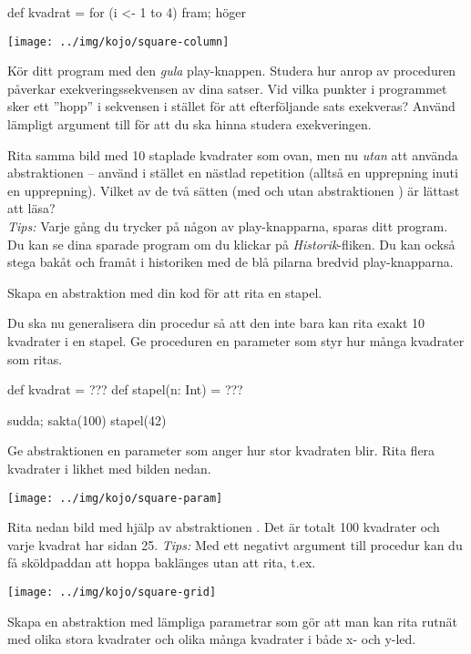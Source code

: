 \begin{Code}
def kvadrat = for (i <- 1 to 4) {fram; höger}
\end{Code}

\texttt{[image: ../img/kojo/square-column]}

\Subtask Kör ditt program med den \emph{gula} play-knappen. Studera hur anrop av proceduren  påverkar exekveringssekvensen av dina satser. Vid vilka punkter i programmet sker ett ''hopp'' i sekvensen i stället för att efterföljande sats exekveras? Använd lämpligt argument till  för att du ska hinna studera exekveringen.

\Subtask Rita samma bild med 10 staplade kvadrater som ovan, men nu \emph{utan} att använda abstraktionen  -- använd i stället en nästlad repetition (alltså en upprepning inuti en upprepning). Vilket av de två sätten (med och utan abstraktionen ) är lättast att läsa?\\ \emph{Tips:} Varje gång du trycker på någon av play-knapparna, sparas ditt program. Du kan se dina sparade program om du klickar på \emph{Historik}-fliken. Du kan också stega bakåt och framåt i historiken med de blå pilarna bredvid play-knapparna.

\Subtask Skapa en abstraktion  med din kod för att rita en stapel.

\Subtask Du ska nu generalisera din procedur så att den inte bara kan rita exakt 10 kvadrater i en stapel. Ge proceduren  en parameter  som styr hur många kvadrater som ritas.
\begin{Code}
def kvadrat = ???
def stapel(n: Int) = ???

sudda; sakta(100)
stapel(42)
\end{Code}

\Subtask Ge abstraktionen  en parameter  som anger hur stor kvadraten blir. Rita flera kvadrater i likhet med bilden nedan.

\texttt{[image: ../img/kojo/square-param]}

\Subtask Rita nedan bild med hjälp av abstraktionen . Det är totalt 100 kvadrater och varje kvadrat har sidan 25. \emph{Tips:} Med ett negativt argument till procedur  kan du få sköldpaddan att hoppa baklänges utan att rita, t.ex. 

\texttt{[image: ../img/kojo/square-grid]}

\Subtask Skapa en abstraktion  med lämpliga parametrar som gör att man kan rita rutnät med olika stora kvadrater och olika många kvadrater i både x- och y-led.

